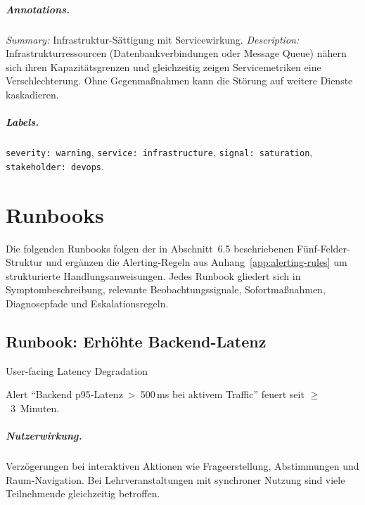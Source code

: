 \paragraph{Annotations.}
\emph{Summary:} Infrastruktur-Sättigung mit Servicewirkung. \emph{Description:} Infrastrukturressourcen (Datenbankverbindungen oder Message Queue) nähern sich ihren Kapazitätsgrenzen und gleichzeitig zeigen Servicemetriken eine Verschlechterung. Ohne Gegenmaßnahmen kann die Störung auf weitere Dienste kaskadieren.

\paragraph{Labels.}
\texttt{severity: warning}, \texttt{service: infrastructure}, \texttt{signal: saturation}, \texttt{stakeholder: devops}.


\chapter{Runbooks}
\label{app:runbooks}

Die folgenden Runbooks folgen der in Abschnitt~6.5 beschriebenen Fünf-Felder-Struktur und ergänzen die Alerting-Regeln aus Anhang~\ref{app:alerting-rules} um strukturierte Handlungsanweisungen. Jedes Runbook gliedert sich in Symptombeschreibung, relevante Beobachtungssignale, Sofortmaßnahmen, Diagnosepfade und Eskalationsregeln.


\section{Runbook: Erhöhte Backend-Latenz}
\label{app:runbook-latenz}

\begin{description}[style=nextline, leftmargin=3.5cm]
  \item[Incident-Typ] User-facing Latency Degradation
  \item[Trigger] Alert \enquote{Backend p95-Latenz~>~500\,ms bei aktivem Traffic} feuert seit $\geq$~3~Minuten.
\end{description}

\paragraph{Nutzerwirkung.}
Verzögerungen bei interaktiven Aktionen wie Frageerstellung, Abstimmungen und Raum-Navigation. Bei Lehrveranstaltungen mit synchroner Nutzung sind viele Teilnehmende gleichzeitig betroffen.

